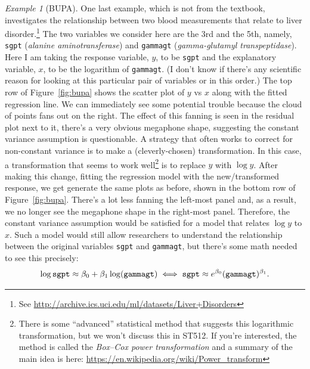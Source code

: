 \documentclass[a4paper, 12pt]{article}
\theoremstyle{plain}
\theoremstyle{definition}
\theoremstyle{remark}
\newtheorem*{example}{Example}
\begin{document}
\begin{example}[BUPA]
One last example, which is not from the textbook, investigates the relationship between two blood measurements that relate to liver disorder.\footnote{See \url{http://archive.ics.uci.edu/ml/datasets/Liver+Disorders}}  The two variables we consider here are the 3rd and the 5th, namely, {\tt sgpt} ({\em alanine aminotransferase}) and {\tt gammagt} ({\em gamma-glutamyl transpeptidase}).  Here I am taking the response variable, $y$, to be {\tt sgpt} and the explanatory variable, $x$, to be the logarithm of {\tt gammagt}.  (I don't know if there's any scientific reason for looking at this particular pair of variables or in this order.)  The top row of Figure~\ref{fig:bupa} shows the scatter plot of $y$ vs $x$ along with the fitted regression line.  We can immediately see some potential trouble because the cloud of points fans out on the right.  The effect of this fanning is seen in the residual plot next to it, there's a very obvious megaphone shape, suggesting the constant variance assumption is questionable.  A strategy that often works to correct for non-constant variance is to make a (cleverly-chosen) transformation.  In this case, a transformation that seems to work well\footnote{There is some ``advanced'' statistical method that suggests this logarithmic transformation, but we won't discuss this in ST512.  If you're interested, the method is called the {\em Box--Cox power transformation} and a summary of the main idea is here: \url{https://en.wikipedia.org/wiki/Power_transform}} is to replace $y$ with $\log y$.  After making this change, fitting the regression model with the new/transformed response, we get generate the same plots as before, shown in the bottom row of Figure~\ref{fig:bupa}.  There's a lot less fanning the left-most panel and, as a result, we no longer see the megaphone shape in the right-most panel.  Therefore, the constant variance assumption would be satisfied for a model that relates $\log y$ to $x$.  Such a model would still allow researchers to understand the relationship between the original variables {\tt sgpt} and {\tt gammagt}, but there's some math needed to see this precisely:
\[ \log {\tt sgpt} \approx \beta_0 + \beta_1 \log ({\tt gammagt}) \iff {\tt sgpt} \approx e^{\beta_0} ({\tt gammagt})^{\beta_1}. \]
\end{example}
\end{document}
